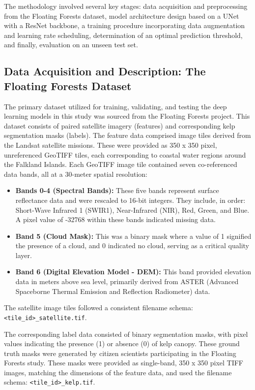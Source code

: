 \documentclass{article}
\begin{document}
The methodology involved several key stages: data acquisition and preprocessing from the Floating Forests dataset, model architecture design based on a UNet with a ResNet backbone, a training procedure incorporating data augmentation and learning rate scheduling, determination of an optimal prediction threshold, and finally, evaluation on an unseen test set.

\subsection{Data Acquisition and Description: The Floating Forests Dataset}

The primary dataset utilized for training, validating, and testing the deep learning models in this study was sourced from the Floating Forests project. This dataset consists of paired satellite imagery (features) and corresponding kelp segmentation masks (labels). The feature data comprised image tiles derived from the Landsat satellite missions. These were provided as 350 x 350 pixel, unreferenced GeoTIFF tiles, each corresponding to coastal water regions around the Falkland Islands. Each GeoTIFF image tile contained seven co-referenced data bands, all at a 30-meter spatial resolution:

\begin{itemize}
    \item \textbf{Bands 0-4 (Spectral Bands):} These five bands represent surface reflectance data and were rescaled to 16-bit integers. They include, in order: Short-Wave Infrared 1 (SWIR1), Near-Infrared (NIR), Red, Green, and Blue. A pixel value of -32768 within these bands indicated missing data.
    \item \textbf{Band 5 (Cloud Mask):} This was a binary mask where a value of 1 signified the presence of a cloud, and 0 indicated no cloud, serving as a critical quality layer.
    \item \textbf{Band 6 (Digital Elevation Model - DEM):} This band provided elevation data in meters above sea level, primarily derived from ASTER (Advanced Spaceborne Thermal Emission and Reflection Radiometer) data.
\end{itemize}
The satellite image tiles followed a consistent filename schema: \texttt{<tile\_id>\_satellite.tif}.

The corresponding label data consisted of binary segmentation masks, with pixel values indicating the presence (1) or absence (0) of kelp canopy. These ground truth masks were generated by citizen scientists participating in the Floating Forests study. These masks were provided as single-band, 350 x 350 pixel TIFF images, matching the dimensions of the feature data, and used the filename schema: \texttt{<tile\_id>\_kelp.tif}.
\end{document}
